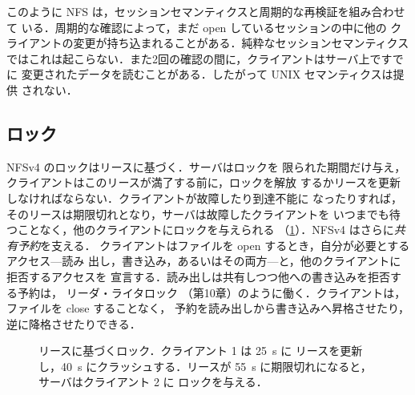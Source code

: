 \documentclass[../main.tex]{subfiles}
\begin{document}
\begin{note}
  このように NFS は，セッションセマンティクスと周期的な再検証を組み合わせて
  いる．周期的な確認によって，まだ
  open しているセッションの中に他の
  クライアントの変更が持ち込まれることがある．純粋なセッションセマンティクス
  ではこれは起こらない．また2回の確認の間に，クライアントはサーバ上ですでに
  変更されたデータを読むことがある．したがって UNIX セマンティクスは提供
  されない．
\end{note}

\subsection{ロック}

NFSv4 のロックはリースに基づく．サーバはロックを
限られた期間だけ与え，クライアントはこのリースが満了する前に，ロックを解放
するかリースを更新しなければならない．クライアントが故障したり到達不能に
なったりすれば，そのリースは期限切れとなり，サーバは故障したクライアントを
いつまでも待つことなく，他のクライアントにロックを与えられる
（\cref{fig:l14-lease}）．NFSv4 はさらに\emph{共有予約}を支える．
クライアントはファイルを open するとき，自分が必要とするアクセス---読み
出し，書き込み，あるいはその両方---と，他のクライアントに拒否するアクセスを
宣言する．読み出しは共有しつつ他への書き込みを拒否する予約は，
リーダ・ライタロック
（第10章）のように働く．クライアントは，ファイルを close することなく，
予約を読み出しから書き込みへ昇格させたり，逆に降格させたりできる．

\begin{figure}[htbp]
  \centering
  
  \caption{リースに基づくロック．クライアント 1 は \SI{25}{\second} に
    リースを更新し，\SI{40}{\second} にクラッシュする．リースが
    \SI{55}{\second} に期限切れになると，サーバはクライアント 2 に
    ロックを与える．}
  \label{fig:l14-lease}
\end{figure}
\end{document}
